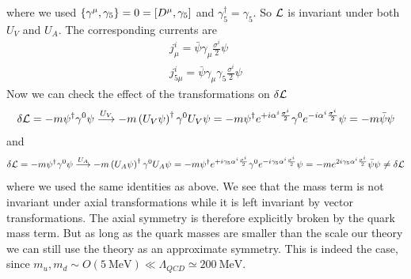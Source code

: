 where we used $\lbrace \gamma^{\mu},\gamma_5 \rbrace = 0 = \left[ D^{\mu},\gamma_5 \right]$ and $\gamma_5^{\dagger} = \gamma_5$.
So $\mathcal{L}$ is invariant under both $U_V$ and $U_A$.
The corresponding currents are
\begin{align}
& j_{\mu}^i = \bar{\psi} \gamma_{\mu} \frac{\sigma^i}{2} \psi & \label{eqn:jV} \\
& j_{5\mu}^i = \bar{\psi} \gamma_{\mu} \gamma_5 \frac{\sigma^i}{2} \label{eqn:jA} \psi & 
\end{align}
Now we can check the effect of the transformations on $\delta \mathcal{L}$
\begin{equation}
\delta \mathcal{L} = - m \psi^{\dagger}\gamma^0 \psi \overset{U_V}{\longrightarrow} - m \left( U_V \psi \right)^{\dagger}\gamma^0 U_V \psi = - m \psi^{\dagger} e^{+i\alpha^i \frac{\sigma^i}{2}} \gamma^0 e^{-i\alpha^i \frac{\sigma^i}{2}} \psi = - m \bar{\psi} \psi
\end{equation}
and 
\begin{equation}
\delta \mathcal{L} = - m \psi^{\dagger}\gamma^0 \psi \overset{U_A}{\longrightarrow} - m \left( U_A \psi \right)^{\dagger}\gamma^0 U_A \psi = - m \psi^{\dagger} e^{+i \gamma_5 \alpha^i  \frac{\sigma^i}{2}} \gamma^0 e^{-i \gamma_5 \alpha^i \frac{\sigma^i}{2}} \psi = - m e^{2i \gamma_5 \alpha^i \frac{\sigma^i}{2}} \bar{\psi} \psi \neq \delta \mathcal{L}
\end{equation}
where we used the same identities as above. We see that the mass term is not invariant under axial transformations while it is left invariant by vector transformations. The axial symmetry is therefore explicitly broken by the quark mass term. But as long as the quark masses are smaller than the scale our theory we can still use the theory as an approximate symmetry. This is indeed the case, since $m_u,m_d \sim O(5 \ \mathrm{MeV}) \ll \Lambda_{QCD} \simeq 200 \ \mathrm{MeV}$.

